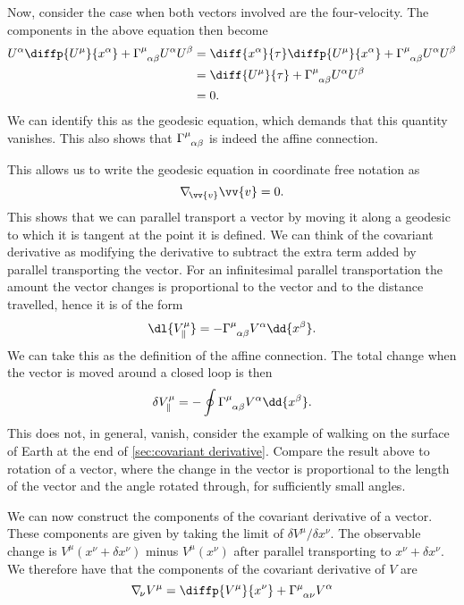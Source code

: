 \documentclass[fleqn]{NotesClass}
\newcommand*{\christoffel}[3]{\tensor{\Gamma}{^{#1}_{{#2}{#3}}}}
\newcommand*{\covariantDerivative}[1]{\nabla_{\!#1}}
\begin{document}
    Now, consider the case when both vectors involved are the four-velocity.
    The components in the above equation then become
    \begin{align}
        U^\alpha \diffp{U^\mu}{x^\alpha} + \christoffel{\mu}{\alpha}{\beta} U^\alpha U^\beta  &= \diff{x^\alpha}{\tau} \diffp{U^\mu}{x^\alpha} + \christoffel{\mu}{\alpha}{\beta} U^\alpha U^\beta\\
        &= \diff{U^\mu}{\tau} + \christoffel{\mu}{\alpha}{\beta} U^\alpha U^\beta\\
        &= 0.
    \end{align}
    We can identify this as the geodesic equation, which demands that this quantity vanishes.
    This also shows that \(\christoffel{\mu}{\alpha}{\beta}\) is indeed the affine connection.
    
    This allows us to write the geodesic equation in coordinate free notation as
    \begin{equation}
        \covariantDerivative{\vv{v}} \vv{v} = 0.
    \end{equation}
    This shows that we can parallel transport a vector by moving it along a geodesic to which it is tangent at the point it is defined.
    We can think of the covariant derivative as modifying the derivative to subtract the extra term added by parallel transporting the vector.
    For an infinitesimal parallel transportation the amount the vector changes is proportional to the vector and to the distance travelled, hence it is of the form
    \begin{equation}
        \dl{V_{\|}^\mu} = -\christoffel{\mu}{\alpha}{\beta} V^\alpha \dd{x^\beta}.
    \end{equation}
    We can take this as the definition of the affine connection.
    The total change when the vector is moved around a closed loop is then
    \begin{equation}
        \delta V_{\|}^\mu = -\oint \christoffel{\mu}{\alpha}{\beta} V^\alpha \dd{x^\beta}.
    \end{equation}
    This does not, in general, vanish, consider the example of walking on the surface of Earth at the end of \cref{sec:covariant derivative}.
    Compare the result above to rotation of a vector, where the change in the vector is proportional to the length of the vector and the angle rotated through, for sufficiently small angles.
    
    We can now construct the components of the covariant derivative of a vector.
    These components are given by taking the limit of \(\delta V^\mu / \delta x^\nu\).
    The observable change is \(V^\mu(x^\nu + \delta x^\nu)\) minus \(V^\mu(x^\nu)\) after parallel transporting to \(x^\nu + \delta x^\nu\).
    We therefore have that the components of the covariant derivative of \(V\) are
    \begin{equation}
        \covariantDerivative{\nu} V^\mu = \diffp{V^\mu}{x^\nu} + \christoffel{\mu}{\alpha}{\nu} V^\alpha
    \end{equation}
    
\end{document}
